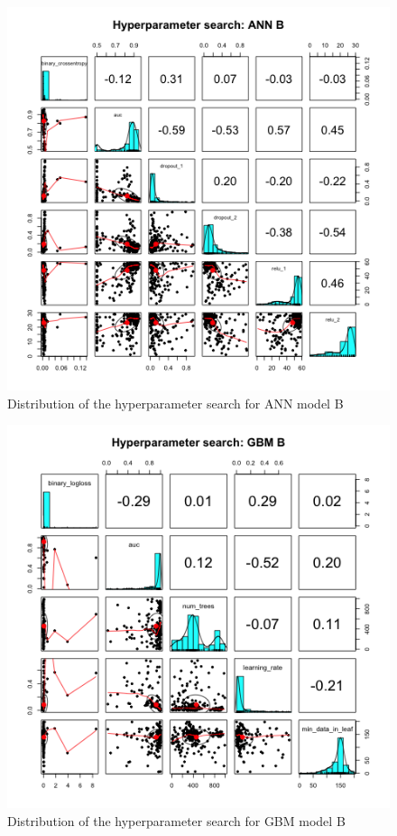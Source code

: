 \documentclass{article}
\begin{document}

\begin{figure}[H]
\centering
\includegraphics[width=0.9\linewidth]{splot_b_ann.png} 
\caption{Distribution of the hyperparameter search for ANN model B}
\label{splot_b_ann}
\end{figure}

\begin{figure}[H]
\centering
\includegraphics[width=0.9\linewidth]{splot_b_gbm.png} 
\caption{Distribution of the hyperparameter search for GBM model B}
\label{splot_b_gbm}
\end{figure}
\end{document}
